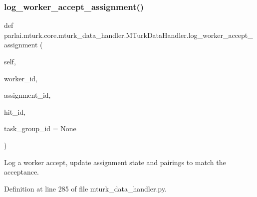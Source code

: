 \subsubsection{\texorpdfstring{log\+\_\+worker\+\_\+accept\+\_\+assignment()}{log\_worker\_accept\_assignment()}}
{\footnotesize\ttfamily def parlai.\+mturk.\+core.\+mturk\+\_\+data\+\_\+handler.\+M\+Turk\+Data\+Handler.\+log\+\_\+worker\+\_\+accept\+\_\+assignment (\begin{DoxyParamCaption}\item[{}]{self,  }\item[{}]{worker\+\_\+id,  }\item[{}]{assignment\+\_\+id,  }\item[{}]{hit\+\_\+id,  }\item[{}]{task\+\_\+group\+\_\+id = {\ttfamily None} }\end{DoxyParamCaption})}

\begin{DoxyVerb}Log a worker accept, update assignment state and pairings to match the
acceptance.
\end{DoxyVerb}
 

Definition at line 285 of file mturk\+\_\+data\+\_\+handler.\+py.


